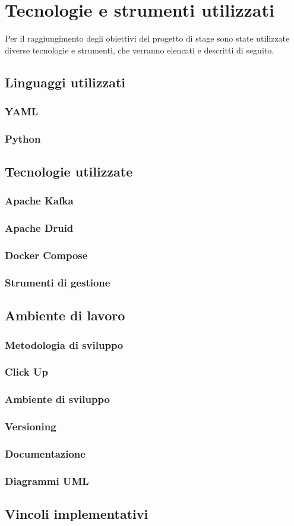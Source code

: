 \chapter{Tecnologie e strumenti utilizzati}\label{cap:Tecnologie e strumenti utilizzati}
Per il raggiungimento degli obiettivi del progetto di stage sono state utilizzate diverse tecnologie e strumenti, che verranno elencati e descritti di seguito.\\
\section{Linguaggi utilizzati}
\subsection{YAML}

\subsection{Python}
\section{Tecnologie utilizzate}
\subsection{Apache Kafka}

\subsection{Apache Druid}
\subsection{Docker Compose}
\subsection{Strumenti di gestione}
\section{Ambiente di lavoro}
\subsection{Metodologia di sviluppo}
\subsection{Click Up}   %
\subsection{Ambiente di sviluppo}
\subsection{Versioning}
\subsection{Documentazione}
\subsection{Diagrammi UML}

\section{Vincoli implementativi}
